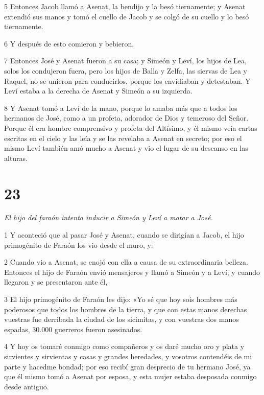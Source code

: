 \par 5 Entonces Jacob llamó a Asenat, la bendijo y la besó tiernamente; y Asenat extendió sus manos y tomó el cuello de Jacob y se colgó de su cuello y lo besó tiernamente.

\par 6 Y después de esto comieron y bebieron.

\par 7 Entonces José y Asenat fueron a su casa; y Simeón y Leví, los hijos de Lea, solos los condujeron fuera, pero los hijos de Balla y Zelfa, las siervas de Lea y Raquel, no se unieron para conducirlos, porque los envidiaban y detestaban. Y Leví estaba a la derecha de Asenat y Simeón a su izquierda.

\par 8 Y Asenat tomó a Leví de la mano, porque lo amaba más que a todos los hermanos de José, como a un profeta, adorador de Dios y temeroso del Señor. Porque él era hombre comprensivo y profeta del Altísimo, y él mismo veía cartas escritas en el cielo y las leía y se las revelaba a Asenat en secreto; por eso el mismo Leví también amó mucho a Asenat y vio el lugar de su descanso en las alturas.

\chapter{23}

\par \textit{El hijo del faraón intenta inducir a Simeón y Leví a matar a José.}


\par 1 Y aconteció que al pasar José y Asenat, cuando se dirigían a Jacob, el hijo primogénito de Faraón los vio desde el muro, y:

\par 2 Cuando vio a Asenat, se enojó con ella a causa de su extraordinaria belleza. Entonces el hijo de Faraón envió mensajeros y llamó a Simeón y a Leví; y cuando llegaron y se presentaron ante él,

\par 3 El hijo primogénito de Faraón les dijo: «Yo sé que hoy sois hombres más poderosos que todos los hombres de la tierra, y que con estas manos derechas vuestras fue derribada la ciudad de los sicimitas, y con vuestras dos manos espadas, 30.000 guerreros fueron asesinados.

\par 4 Y hoy os tomaré conmigo como compañeros y os daré mucho oro y plata y sirvientes y sirvientas y casas y grandes heredades, y vosotros contendéis de mi parte y hacedme bondad; por eso recibí gran desprecio de tu hermano José, ya que él mismo tomó a Asenat por esposa, y esta mujer estaba desposada conmigo desde antiguo.

